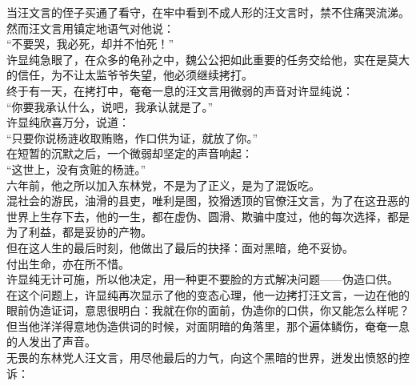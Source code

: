 \begin{multicols}{\theparacolNo}
当汪文言的侄子买通了看守，在牢中看到不成人形的汪文言时，禁不住痛哭流涕。\\

然而汪文言用镇定地语气对他说：\\

“不要哭，我必死，却并不怕死！”\\

许显纯急眼了，在众多的龟孙之中，魏公公把如此重要的任务交给他，实在是莫大的信任，为不让太监爷爷失望，他必须继续拷打。\\

终于有一天，在拷打中，奄奄一息的汪文言用微弱的声音对许显纯说：\\

“你要我承认什么，说吧，我承认就是了。”\\

许显纯欣喜万分，说道：\\

“只要你说杨涟收取贿赂，作口供为证，就放了你。”\\

在短暂的沉默之后，一个微弱却坚定的声音响起：\\

“这世上，没有贪赃的杨涟。”\\

六年前，他之所以加入东林党，不是为了正义，是为了混饭吃。\\

混社会的游民，油滑的县吏，唯利是图，狡猾透顶的官僚汪文言，为了在这丑恶的世界上生存下去，他的一生，都在虚伪、圆滑、欺骗中度过，他的每次选择，都是为了利益，都是妥协的产物。\\

但在这人生的最后时刻，他做出了最后的抉择：面对黑暗，绝不妥协。\\

付出生命，亦在所不惜。\\

许显纯无计可施，所以他决定，用一种更不要脸的方式解决问题——伪造口供。\\

在这个问题上，许显纯再次显示了他的变态心理，他一边拷打汪文言，一边在他的眼前伪造证词，意思很明白：我就在你的面前，伪造你的口供，你又能怎么样呢？\\

但当他洋洋得意地伪造供词的时候，对面阴暗的角落里，那个遍体鳞伤，奄奄一息的人发出了声音。\\

无畏的东林党人汪文言，用尽他最后的力气，向这个黑暗的世界，迸发出愤怒的控诉：\\


\end{multicols}
